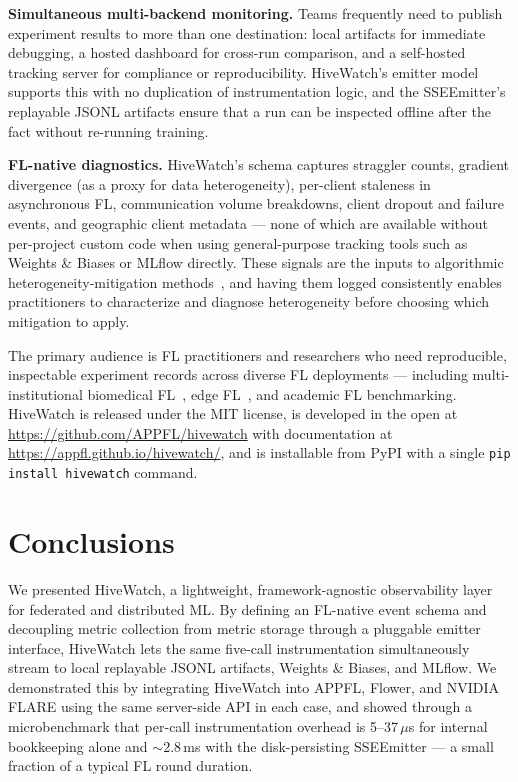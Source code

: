 \documentclass[preprint,12pt, a4paper]{elsarticle}
\begin{document}
\textbf{Simultaneous multi-backend monitoring.} Teams frequently need to publish experiment results to more than one destination: local artifacts for immediate debugging, a hosted dashboard for cross-run comparison, and a self-hosted tracking server for compliance or reproducibility. HiveWatch's emitter model supports this with no duplication of instrumentation logic, and the SSEEmitter's replayable JSONL artifacts ensure that a run can be inspected offline after the fact without re-running training.

\textbf{FL-native diagnostics.} HiveWatch's schema captures straggler counts, gradient divergence (as a proxy for data heterogeneity), per-client staleness in asynchronous FL, communication volume breakdowns, client dropout and failure events, and geographic client metadata — none of which are available without per-project custom code when using general-purpose tracking tools such as Weights \& Biases or MLflow directly. These signals are the inputs to algorithmic heterogeneity-mitigation methods~\cite{lai2021oort,li2024fedcompass,xie2019asynchronous}, and having them logged consistently enables practitioners to characterize and diagnose heterogeneity before choosing which mitigation to apply.

The primary audience is FL practitioners and researchers who need reproducible, inspectable experiment records across diverse FL deployments — including multi-institutional biomedical FL~\cite{rieke2020future}, edge FL~\cite{lim2020federated}, and academic FL benchmarking. HiveWatch is released under the MIT license, is developed in the open at \url{https://github.com/APPFL/hivewatch} with documentation at \url{https://appfl.github.io/hivewatch/}, and is installable from PyPI with a single \texttt{pip install hivewatch} command.

\section{Conclusions}
\label{sec:conclusion}
We presented HiveWatch, a lightweight, framework-agnostic observability layer for federated and distributed ML. By defining an FL-native event schema and decoupling metric collection from metric storage through a pluggable emitter interface, HiveWatch lets the same five-call instrumentation simultaneously stream to local replayable JSONL artifacts, Weights \& Biases, and MLflow. We demonstrated this by integrating HiveWatch into APPFL, Flower, and NVIDIA FLARE using the same server-side API in each case, and showed through a microbenchmark that per-call instrumentation overhead is 5--37\,$\mu$s for internal bookkeeping alone and $\sim$2.8\,ms with the disk-persisting SSEEmitter — a small fraction of a typical FL round duration.
\end{document}

